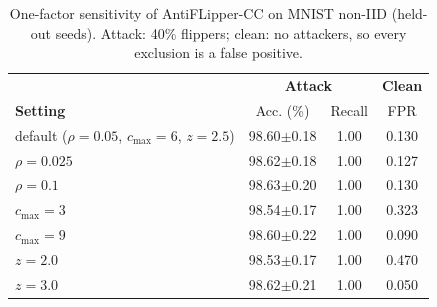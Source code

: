 \begin{table}[t]
\centering
\caption{One-factor sensitivity of AntiFLipper-CC on MNIST non-IID (held-out seeds). Attack: 40\% flippers; clean: no attackers, so every exclusion is a false positive.}
\label{tab:sensitivity}
\renewcommand{\arraystretch}{1.1}
\footnotesize
\begin{tabular}{l|cc|c}
\hline
& \multicolumn{2}{c|}{\textbf{Attack}} & \textbf{Clean} \\
\textbf{Setting} & Acc. (\%) & Recall & FPR \\
\hline
default ($\rho{=}0.05$, $c_{\max}{=}6$, $z{=}2.5$) & 98.60$\pm$0.18 & 1.00 & 0.130 \\
$\rho=0.025$ & 98.62$\pm$0.18 & 1.00 & 0.127 \\
$\rho=0.1$ & 98.63$\pm$0.20 & 1.00 & 0.130 \\
$c_{\max}=3$ & 98.54$\pm$0.17 & 1.00 & 0.323 \\
$c_{\max}=9$ & 98.60$\pm$0.22 & 1.00 & 0.090 \\
$z=2.0$ & 98.53$\pm$0.17 & 1.00 & 0.470 \\
$z=3.0$ & 98.62$\pm$0.21 & 1.00 & 0.050 \\
\hline
\end{tabular}
\end{table}
